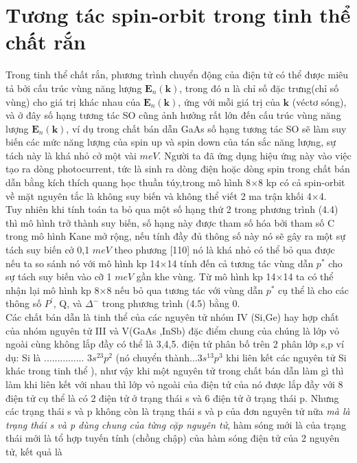   \section{Tương tác spin-orbit trong tinh thể chất rắn}
  Trong tinh thể chất rắn, phương trình chuyển động của điện tử có thể được miêu tả bởi cấu trúc vùng năng lượng $\mathbf{E}_n\left(\mathbf{k}\right)$, trong đó n là chỉ số đặc trưng(chỉ số vùng) cho giá trị khác nhau của $\mathbf{E}_n(\mathbf{k})$, ứng với mỗi giá trị của $\mathbf{k}$ (véctơ sóng), và ở đây số hạng tương tác SO cũng ảnh hưởng rất lớn đến cấu trúc vùng năng lượng  $\mathbf{E}_n\left(\mathbf{k}\right)$, ví dụ trong chất bán dẫn GaAs số hạng tương tác SO sẽ làm suy biến các mức năng lượng của spin up và spin down của tán sắc năng lượng, sự tách này là khá nhỏ cở một vài $meV$. Người ta đã ứng dụng hiệu ứng này vào việc tạo ra dòng photocurrent, tức là sinh ra dòng điện hoặc dòng spin trong chất bán dẫn bằng kích thích quang học thuần túy,trong mô hình 8$\times$8 kp có cả spin-orbit về mặt nguyên tắc là không suy biến và không thể viết 2 ma trận khối 4$\times$4.\\
  Tuy nhiên khi tính toán ta bỏ qua  một số hạng thứ 2 trong phương trình (4.4) thì mô hình trở thành suy biến, số hạng này được tham số hóa bởi tham số C trong mô hình Kane mở rộng, nếu tính đầy đủ thông số này nó sẽ gây ra một sự tách suy biến cở 0,1 $meV$ theo phương [110] nó là khá nhỏ có thể bỏ qua được nếu ta so sánh nó với mô hình kp 14$\times$14 tính đến cả tương tác vùng dẫn $p^*$ cho sự tách suy biến vào cỡ 1 $meV$ gần khe vùng. Từ mô hình kp 14$\times$14 ta có thể nhận lại mô hình kp 8$\times$8 nếu bỏ qua tương tác với vùng dẫn $p^*$ cụ thể là cho các thông số $P^{'}$, Q, và $\Delta^{-}$ trong phương trình (4.5) bằng 0.\\
  Các chất bán dẫn là tinh thể của các nguyên tử nhóm IV (Si,Ge) hay hợp chất của nhóm nguyên tử III và V(GaAs ,InSb) đặc điểm chung của chúng là lớp vỏ ngoài cùng không lắp đầy có thể là 3,4,5. điện tử phân bố trên 2 phân lớp s,p ví dụ: Si là ............... $3s^23p^2$ (nó chuyển thành$\dots 3s^13p^3$ khi liên kết các nguyên tử Si khác trong tinh thể ), như vậy khi một nguyên tử trong chất bán dẫn làm gì thì làm khi liên kết với nhau thì lớp vỏ ngoài của điện tử của nó được lắp đầy với 8 điện tử cụ thể là có 2 điện tử ở trạng thái s và 6 điện tử ở trạng thái p. Nhưng các trạng thái s và p không còn là trạng thái s và p của đơn nguyên tử  nữa \emph{mà là trạng thái s và p dùng chung của từng cặp nguyên tử}, hàm sóng mới là của trạng thái mới là tổ hợp tuyến tính (chồng chập) của hàm sóng điện tử của 2 nguyên tử, kết quả là 
